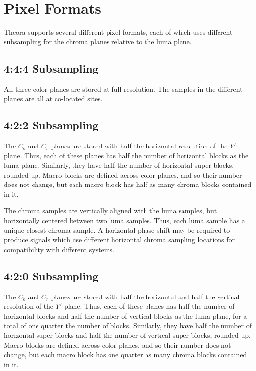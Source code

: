 \documentclass[11pt,letterpaper]{book}
\numberwithin{equation}{chapter}
\numberwithin{figure}{chapter}
\numberwithin{table}{chapter}
\begin{document}
\section{Pixel Formats}
\label{sec:pixfmts}

Theora supports several different pixel formats, each of which uses different
 subsampling for the chroma planes relative to the luma plane.

\subsection{4:4:4 Subsampling}
\label{sec:444}

All three color planes are stored at full resolution.
The samples in the different planes are all at co-located sites.

%
%
%
%
%
%


\subsection{4:2:2 Subsampling}
\label{sec:422}

The $C_b$ and $C_r$ planes are stored with half the horizontal resolution of
 the $Y'$ plane.
Thus, each of these planes has half the number of horizontal blocks as the luma
 plane.
Similarly, they have half the number of horizontal super blocks, rounded up.
Macro blocks are defined across color planes, and so their number does not
 change, but each macro block has half as many chroma blocks contained in it.

The chroma samples are vertically aligned with the luma samples, but
 horizontally centered between two luma samples.
Thus, each luma sample has a unique closest chroma sample.
A horizontal phase shift may be required to produce signals which use different
 horizontal chroma sampling locations for compatibility with different systems.

%
%
%
%
%
%

\subsection{4:2:0 Subsampling}
\label{sec:420}

The $C_b$ and $C_r$ planes are stored with half the horizontal and half the
 vertical resolution of the $Y'$ plane.
Thus, each of these planes has half the number of horizontal blocks and half
 the number of vertical blocks as the luma plane, for a total of one quarter
 the number of blocks.
Similarly, they have half the number of horizontal super blocks and half the
 number of vertical super blocks, rounded up.
Macro blocks are defined across color planes, and so their number does not
 change, but each macro block has one quarter as many chroma blocks contained
 in it.
\end{document}
